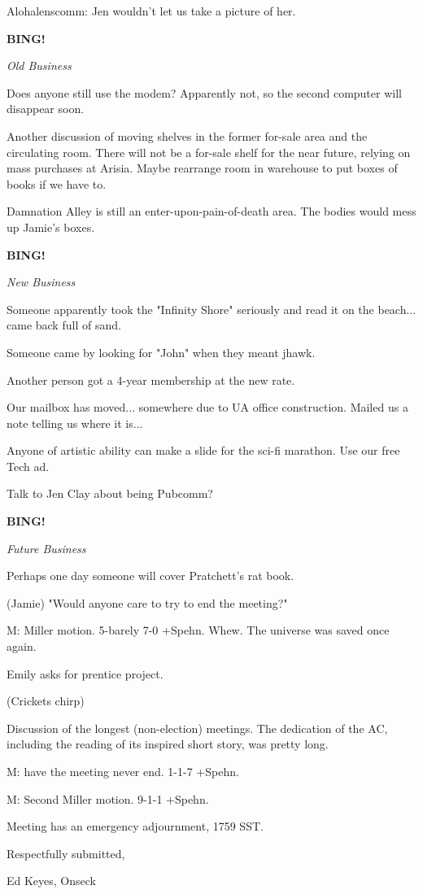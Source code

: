 \documentclass[12pt]{article}
\newcommand{\bing}{{\bf BING!} }
\newcommand{\goto}[1]{\bing \vskip 12pt \centerline{{\em{#1}}}}
\begin{document}
Alohalenscomm: Jen wouldn't let us take a picture of her.

\goto{Old Business}

Does anyone still use the modem? Apparently not, so the second computer will disappear soon.

Another discussion of moving shelves in the former for-sale area and the circulating room. There will not be a for-sale shelf for the near future, relying on mass purchases at Arisia. Maybe rearrange room in warehouse to put boxes of books if we have to.

Damnation Alley is still an enter-upon-pain-of-death area. The bodies would mess up Jamie's boxes.

\goto{New Business}

Someone apparently took the "Infinity Shore" seriously and read it on the beach... came back full of sand.

Someone came by looking for "John" when they meant jhawk.

Another person got a 4-year membership at the new rate.

Our mailbox has moved... somewhere due to UA office construction. Mailed us a note telling us where it is...

Anyone of artistic ability can make a slide for the sci-fi marathon. Use our free Tech ad.

Talk to Jen Clay about being Pubcomm?

\goto{Future Business}

Perhaps one day someone will cover Pratchett's rat book.

(Jamie) "Would anyone care to try to end the meeting?"

M: Miller motion. 5-barely 7-0 +Spehn. Whew. The universe was saved once again.

Emily asks for prentice project.

(Crickets chirp)

Discussion of the longest (non-election) meetings. The dedication of the AC, including the reading of its inspired short story, was pretty long.

M: have the meeting never end. 1-1-7 +Spehn.

M: Second Miller motion. 9-1-1 +Spehn.

\vspace{12pt}

\noindent
Meeting has an emergency adjournment, 1759 SST.

\vspace{18pt}

\centerline{Respectfully submitted,}
\centerline{Ed Keyes, Onseck}
\end{document}
